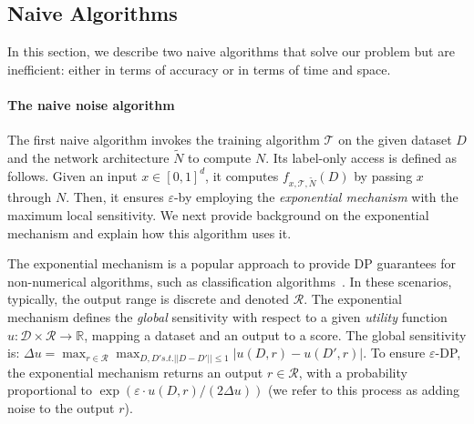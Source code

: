 \subsection{Naive Algorithms} \label{sec:naive}
In this section, we describe two naive algorithms that solve our problem but are inefficient: either in terms of accuracy or in terms of time and space. 

\paragraph{The naive noise algorithm} The first naive algorithm invokes the training algorithm $\mathcal{T}$ on the given dataset $D$ and the network architecture $\widetilde{N}$ to compute $N$. Its label-only access is defined as follows. Given an input $x\in [0,1]^d$,
 it computes $f_{x,\mathcal{T},\widetilde{N}}(D)$
 by passing $x$ through $N$. Then, it ensures $\varepsilon$-\propi by employing the \emph{exponential mechanism} with the maximum local sensitivity. %
We next provide background on the exponential mechanism and explain how this algorithm uses it. %

The exponential mechanism is a popular approach to provide DP guarantees for non-numerical algorithms, such as classification algorithms~\citep{ref_91,Dwork06,ref_92}. In these scenarios, typically, the output range is discrete and denoted $\mathcal{R}$.  
The exponential mechanism defines the \emph{global} sensitivity with respect to a given
\emph{utility} function $u:\mathcal{D} \times \mathcal{R} \rightarrow \mathbb{R}$, 
mapping a dataset and an output to a score.
The global sensitivity is: $\Delta u = \max_{r \in \mathcal{R}} \max_{D,D' s.t. ||D - D'|| \leq 1} |u(D,r) - u(D',r)|$.
To ensure $\varepsilon$-DP, the exponential mechanism returns an output $r \in \mathcal{R}$, 
with a probability proportional to $\exp(\varepsilon \cdot u(D,r) / (2\Delta u))$ (we refer to this process as adding noise to the output $r$). 

